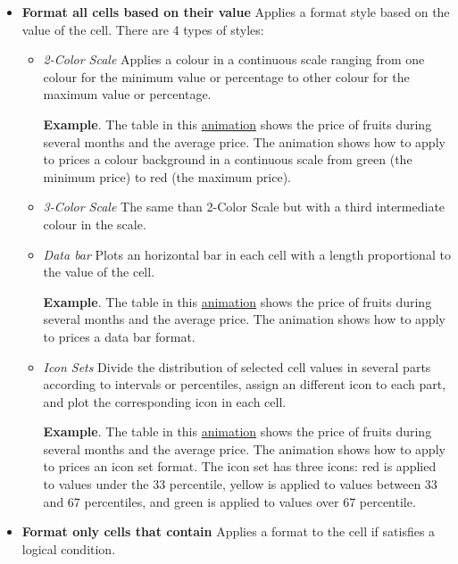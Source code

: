 \begin{itemize}
\item \textbf{Format all cells based on their value} Applies a format style based on the value of the cell. There are 4 types of styles:


\begin{itemize}
\item \emph{2-Color Scale} Applies a colour in a continuous scale ranging from one colour for the minimum value or percentage to other colour for the maximum value or percentage.

\textbf{Example}. The table in this \href{http://aprendeconalf.es/office/excel/manual/img/example_conditional_formatting_colour_scale.gif}{animation} shows the price of fruits during several months and the average price. The animation shows how to apply to prices a colour background in a continuous scale from green (the minimum price) to red (the maximum price).
\item \emph{3-Color Scale} The same than 2-Color Scale but with a third intermediate colour in the scale.
\item \emph{Data bar} Plots an horizontal bar in each cell with a length proportional to the value of the cell.

\textbf{Example}. The table in this \href{http://aprendeconalf.es/office/excel/manual/img/example_conditional_formatting_data_bar.gif}{animation} shows the price of fruits during several months and the average price. The animation shows how to apply to prices a data bar format.
\item \emph{Icon Sets} Divide the distribution of selected cell values in several parts according to intervals or percentiles, assign an different icon to each part, and plot the corresponding icon in each cell.

\textbf{Example}. The table in this \href{http://aprendeconalf.es/office/excel/manual/img/example_conditional_formatting_icon_set.gif}{animation} shows the price of fruits during several months and the average price. The animation shows how to apply to prices an icon set format. The icon set has three icons: red is applied to values under the 33 percentile, yellow is applied to values between 33 and 67 percentiles, and green is applied to values over 67 percentile.
\end{itemize}
\item \textbf{Format only cells that contain} Applies a format to the cell if satisfies a logical condition.
\end{itemize}


